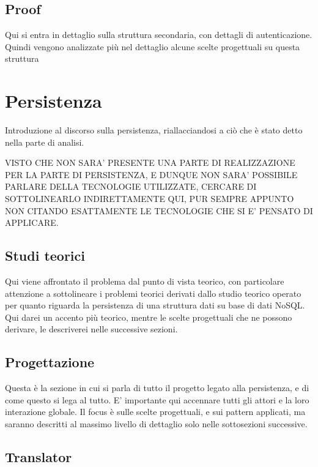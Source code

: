 	\subsection{Proof}
	
		Qui si entra in dettaglio sulla struttura secondaria, con dettagli di autenticazione. Quindi vengono analizzate più nel dettaglio alcune scelte progettuali
		su questa struttura
	
\section{Persistenza}

	Introduzione al discorso sulla persistenza, riallacciandosi a ciò che è stato detto nella parte di analisi.
	
	VISTO CHE NON SARA' PRESENTE UNA PARTE DI REALIZZAZIONE PER LA PARTE DI PERSISTENZA, E DUNQUE
	NON SARA' POSSIBILE PARLARE DELLA TECNOLOGIE UTILIZZATE, CERCARE DI SOTTOLINEARLO INDIRETTAMENTE QUI,
	PUR SEMPRE APPUNTO NON CITANDO ESATTAMENTE LE TECNOLOGIE CHE SI E' PENSATO DI APPLICARE.
		
	\subsection{Studi teorici}
		
		Qui viene affrontato il problema dal punto di vista teorico, con particolare attenzione a sottolineare i problemi teorici derivati dallo studio 
		teorico operato per quanto riguarda la persistenza di una struttura dati su base di dati NoSQL. Qui darei un accento più teorico, mentre le 
		scelte progettuali che ne possono derivare, le descriverei nelle successive sezioni.
		
	\subsection{Progettazione}
	
	Questa è la sezione in cui si parla di tutto il progetto legato alla persistenza, e di come questo si lega al tutto.
	E' importante qui accennare tutti gli attori e la loro interazione globale. Il focus è sulle scelte progettuali, e sui
	pattern applicati, ma saranno descritti al massimo livello di dettaglio solo nelle sottosezioni successive.
		
	\subsection{Translator}
	
